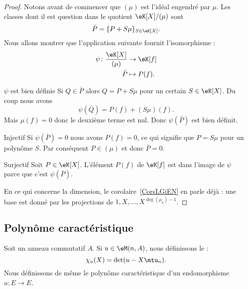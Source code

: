 \begin{proof}
    Notons avant de commencer que \( (\mu)\) est l'idéal engendré par \( \mu\). Les classes dont il est question dans le quotient \( \eK[X]/(\mu)\) sont
    \begin{equation}
        \bar P=\{ P+S\mu \}_{S\in \eK[X]}.
    \end{equation}
    Nous allons montrer que l'application suivante fournit l'isomorphisme :
    \begin{equation}
        \begin{aligned}
            \psi\colon \frac{ \eK[X] }{ (\mu) }&\to \eK[f] \\
            \bar P&\mapsto P(f).
        \end{aligned}
    \end{equation}
    \begin{subproof}
        \item[\( \psi\) est bien définie]
            Si \( Q\in \bar P\) alors \( Q=P+S\mu\) pour un certain \( S\in \eK[X]\). Du coup nous avons
            \begin{equation}
                \psi(\bar Q)=P(f)+(S\mu)(f).
            \end{equation}
            Mais \( \mu(f)=0\) donc le deuxième terme est nul. Donc \( \psi(\bar P)\) est bien définit.
        \item[Injectif]
            Si \( \psi(\bar P)=0\) nous avons \( P(f)=0\), ce qui signifie que \( P=S\mu\) pour un polynôme \( S\). Par conséquent \( P\in (\mu)\) et donc \( \bar P=0\).
        \item[Surjectif]
            Soit \( P\in \eK[X]\). L'élément \( P(f) \) de \( \eK[f]\) est dans l'image de \( \psi\) parce que c'est \( \psi(\bar P)\).
    \end{subproof}
    En ce qui concerne la dimension, le corolaire~\ref{CorsLGiEN} en parle déjà : une base est donné par les projections de \( 1,X,\ldots, X^{\deg(\mu_a)-1}\).
\end{proof}

\subsection{Polynôme caractéristique}

\begin{definition}  \label{DefOWQooXbybYD}
    Soit un anneau commutatif \( A\). Si \( u\in\eM(n,A)\), nous définissons le  :
    \begin{equation}    \label{Eqkxbdfu}
        \chi_u(X)=\det(u-X\mtu_n).
    \end{equation}
    Nous définissons de même le polynôme caractéristique d'un endomorphisme \( u\colon E\to E\).
\end{definition}

